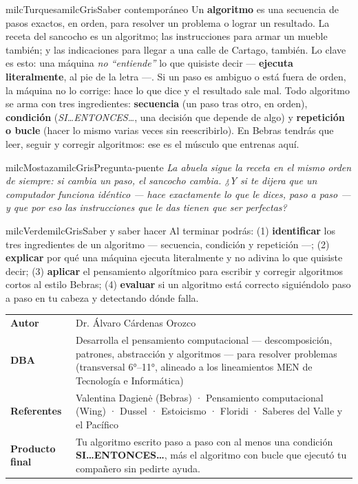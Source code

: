 \documentclass[11pt,letterpaper]{article}
\begin{document}
\begin{softbox}{milcTurquesa}{milcGris}{Saber contemporáneo}
Un \textbf{algoritmo} es una secuencia de pasos exactos, en orden, para resolver un problema o lograr un resultado. La receta del sancocho es un algoritmo; las instrucciones para armar un mueble también; y las indicaciones para llegar a una calle de Cartago, también. Lo clave es esto: una máquina \emph{no ``entiende''} lo que quisiste decir --- \textbf{ejecuta literalmente}, al pie de la letra ---. Si un paso es ambiguo o está fuera de orden, la máquina no lo corrige: hace lo que dice y el resultado sale mal. Todo algoritmo se arma con tres ingredientes: \textbf{secuencia} (un paso tras otro, en orden), \textbf{condición} (\emph{SI\ldots ENTONCES\ldots}, una decisión que depende de algo) y \textbf{repetición o bucle} (hacer lo mismo varias veces sin reescribirlo). En Bebras tendrás que leer, seguir y corregir algoritmos: ese es el músculo que entrenas aquí.
\end{softbox}

\begin{softbox}{milcMostaza}{milcGris}{Pregunta-puente}
\textit{La abuela sigue la receta en el mismo orden de siempre: si cambia un paso, el sancocho cambia. ¿Y si te dijera que un computador funciona idéntico --- hace exactamente lo que le dices, paso a paso --- y que por eso las instrucciones que le das tienen que ser perfectas?}
\end{softbox}

\begin{softbox}{milcVerde}{milcGris}{Saber y saber hacer}
Al terminar podrás: (1) \textbf{identificar} los tres ingredientes de un algoritmo --- secuencia, condición y repetición ---; (2) \textbf{explicar} por qué una máquina ejecuta literalmente y no adivina lo que quisiste decir; (3) \textbf{aplicar} el pensamiento algorítmico para escribir y corregir algoritmos cortos al estilo Bebras; (4) \textbf{evaluar} si un algoritmo está correcto siguiéndolo paso a paso en tu cabeza y detectando dónde falla.
\end{softbox}



\small
\begin{tabularx}{\textwidth}{>{\bfseries}p{3.0cm}Y}
Autor & Dr. Álvaro Cárdenas Orozco\\
DBA & Desarrolla el pensamiento computacional --- descomposición, patrones, abstracción y algoritmos --- para resolver problemas (transversal 6°--11°, alineado a los lineamientos MEN de Tecnología e Informática)\\
Referentes & Valentina Dagienė (Bebras) · Pensamiento computacional (Wing) · Dussel · Estoicismo · Floridi · Saberes del Valle y el Pacífico\\
Producto final & Tu algoritmo escrito paso a paso con al menos una condición \textbf{SI\ldots ENTONCES\ldots}, más el algoritmo con bucle que ejecutó tu compañero sin pedirte ayuda.\\
\end{tabularx}
\normalsize
\end{document}
